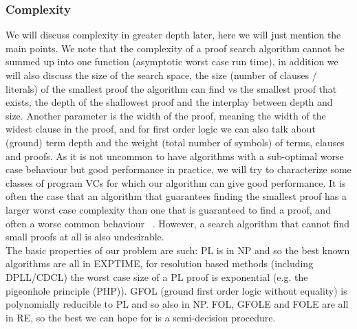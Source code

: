 \subsubsection*{Complexity}
\noindent
We will discuss complexity in greater depth later, here we will just mention the main points.
We note that the complexity of a proof search algorithm cannot be summed up into one function (asymptotic worst case run time), 
in addition we will also discuss the size of the search space, the size (number of clauses / literals) of the smallest proof the algorithm can find vs the smallest proof that exists, the depth of the shallowest proof and the interplay between depth and size.
Another parameter is the width of the proof, meaning the width of the widest clause in the proof, and for first order logic we can also talk about (ground) term depth and the weight (total number of symbols) of terms, clauses and proofs.
As it is not uncommon to have algorithms with a sub-optimal worse case behaviour but good performance in practice, we will try to characterize some classes of program VCs for which our algorithm can give good performance.
It is often the case that an algorithm that guarantees finding the smallest proof has a larger worst case complexity than one that is guaranteed to find a proof, and often a worse common behaviour ~\cite{}. However, a search algorithm that cannot find small proofs at all is also undesirable.\\
The basic properties of our problem are such: PL is in NP and so the best known algorithms are all in EXPTIME, for resolution based methods (including DPLL/CDCL) the worst case size of a PL proof is exponential (e.g. the pigeonhole principle (PHP)). GFOL (ground first order logic without equality) is polynomially reducible to PL and so also in NP. 
FOL, GFOLE and FOLE are all in RE, so the best we can hope for is a semi-decision procedure.

